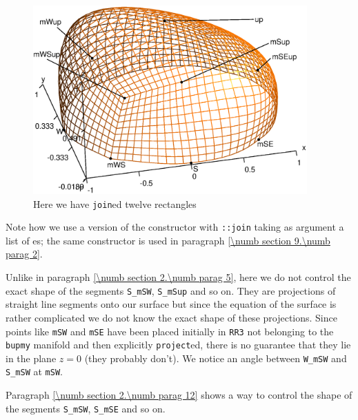 \begin{figure} \centering
  \includegraphics[width=105mm]{hemisphere-2}
  \caption{Here we have {\small\tt join}ed twelve rectangles}
  \label{\numb section 2.\numb fig 6}
\end{figure}

Note how we use a version of the {\small\tt {}} constructor with {\small\tt {}::join}
taking as argument a list of {\small\tt {}}es; the same constructor is used in
paragraph \ref{\numb section 9.\numb parag 2}.

Unlike in paragraph \ref{\numb section 2.\numb parag 5}, here we do not control the
exact shape of the segments {\small\tt S\_mSW}, {\small\tt S\_mSup} and so on.
They are projections of straight line segments onto our surface but since the equation
of the surface is rather complicated we do not know the exact shape of these projections.
Since points like {\small\tt mSW} and {\small\tt mSE} have been placed initially in
{\small\tt RR3} not belonging to the {\small\tt bupmy} manifold and then explicitly
{\small\tt project}ed,
there is no guarantee that they lie in the plane $ z = 0 $ (they probably don't).
We notice an angle between {\small\tt W\_mSW} and {\small\tt S\_mSW} at {\small\tt mSW}.

Paragraph \ref{\numb section 2.\numb parag 12} shows a way to control the shape of the segments
{\small\tt S\_mSW}, {\small\tt S\_mSE} and so on.


